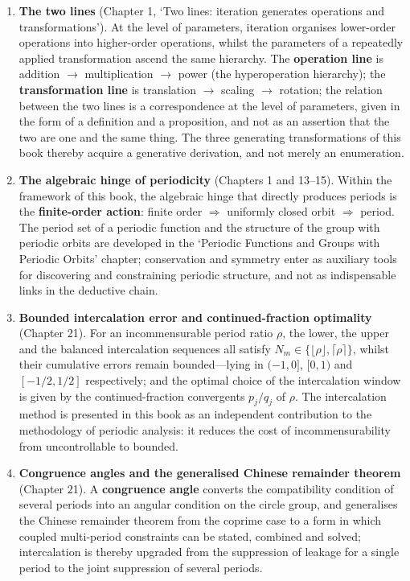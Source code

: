 \begin{enumerate}[leftmargin=4em, label={(\arabic*)}]
    \item \textbf{The two lines} (Chapter 1, `Two lines: iteration generates operations and transformations'). At the level of parameters, iteration organises lower-order operations into higher-order operations, whilst the parameters of a repeatedly applied transformation ascend the same hierarchy. The \textbf{operation line} is addition $\to$ multiplication $\to$ power (the hyperoperation hierarchy); the \textbf{transformation line} is translation $\to$ scaling $\to$ rotation; the relation between the two lines is a correspondence at the level of parameters, given in the form of a definition and a proposition, and not as an assertion that the two are one and the same thing. The three generating transformations of this book thereby acquire a generative derivation, and not merely an enumeration.
    \item \textbf{The algebraic hinge of periodicity} (Chapters 1 and 13--15). Within the framework of this book, the algebraic hinge that directly produces periods is the \textbf{finite-order action}: finite order $\Rightarrow$ uniformly closed orbit $\Rightarrow$ period. The period set of a periodic function and the structure of the group with periodic orbits are developed in the `Periodic Functions and Groups with Periodic Orbits' chapter; conservation and symmetry enter as auxiliary tools for discovering and constraining periodic structure, and not as indispensable links in the deductive chain.
    \item \textbf{Bounded intercalation error and continued-fraction optimality} (Chapter 21). For an incommensurable period ratio $\rho$, the lower, the upper and the balanced intercalation sequences all satisfy $N_m \in \{\lfloor\rho\rfloor, \lceil\rho\rceil\}$, whilst their cumulative errors remain bounded---lying in $(-1,0]$, $[0,1)$ and $[-1/2,1/2]$ respectively; and the optimal choice of the intercalation window is given by the continued-fraction convergents $p_j/q_j$ of $\rho$. The intercalation method is presented in this book as an independent contribution to the methodology of periodic analysis: it reduces the cost of incommensurability from uncontrollable to bounded.
    \item \textbf{Congruence angles and the generalised Chinese remainder theorem} (Chapter 21). A \textbf{congruence angle} converts the compatibility condition of several periods into an angular condition on the circle group, and generalises the Chinese remainder theorem from the coprime case to a form in which coupled multi-period constraints can be stated, combined and solved; intercalation is thereby upgraded from the suppression of leakage for a single period to the joint suppression of several periods.

\end{enumerate}
